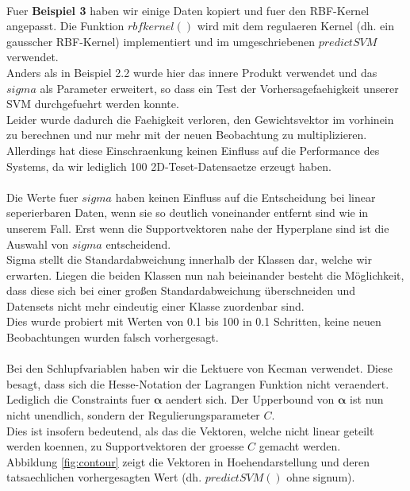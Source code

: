 \documentclass[12pt]{article}
\begin{document}
\\
Fuer \textbf{Beispiel 3} haben wir einige Daten kopiert und fuer den RBF-Kernel angepasst. Die Funktion $rbfkernel()$ wird mit dem regulaeren Kernel (dh. ein gausscher RBF-Kernel) implementiert und im umgeschriebenen $predictSVM$ verwendet.
\\
Anders als in Beispiel 2.2 wurde hier das innere Produkt verwendet und das $sigma$ als Parameter erweitert, so dass ein Test der Vorhersagefaehigkeit unserer SVM durchgefuehrt werden konnte.\\
Leider wurde dadurch die Faehigkeit verloren, den Gewichtsvektor im vorhinein zu berechnen und nur mehr mit der neuen Beobachtung zu multiplizieren. Allerdings hat diese Einschraenkung keinen Einfluss auf die Performance des Systems, da wir lediglich 100 2D-Teset-Datensaetze erzeugt haben.
\\
\\
Die Werte fuer $sigma$ haben keinen Einfluss auf die Entscheidung bei linear seperierbaren Daten, wenn sie so deutlich voneinander entfernt sind wie in unserem Fall. Erst wenn die Supportvektoren nahe der Hyperplane sind ist die Auswahl von $sigma$ entscheidend.
\\
Sigma stellt die Standardabweichung innerhalb der Klassen dar, welche wir erwarten. Liegen die beiden Klassen nun nah beieinander besteht die Möglichkeit, dass diese sich bei einer großen Standardabweichung überschneiden und Datensets nicht mehr eindeutig einer Klasse zuordenbar sind.
\\
Dies wurde probiert mit Werten von 0.1 bis 100 in 0.1 Schritten, keine neuen Beobachtungen wurden falsch vorhergesagt.
\\
\\
Bei den Schlupfvariablen haben wir die Lektuere von Kecman \cite{kecman} verwendet. Diese besagt, dass sich die Hesse-Notation der Lagrangen Funktion nicht veraendert. Lediglich die Constraints fuer $\boldsymbol{\alpha}$ aendert sich. Der Upperbound von $\boldsymbol{\alpha}$ ist nun nicht unendlich, sondern der Regulierungsparameter $C$.
\\
Dies ist insofern bedeutend, als das die Vektoren, welche nicht linear geteilt werden koennen, zu Supportvektoren der groesse $C$ gemacht werden.
\\
Abbildung \ref{fig:contour} zeigt die Vektoren in Hoehendarstellung und deren tatsaechlichen vorhergesagten Wert (dh. $predictSVM()$ ohne signum).
\end{document}
